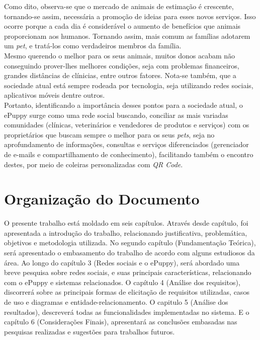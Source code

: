 Como dito, observa-se que o mercado de animais de estimação é crescente, tornando-se assim, necessária a promoção de ideias para esses novos serviços. Isso ocorre porque a cada dia é considerável o aumento de benefícios que animais proporcionam aos humanos. Tornando assim, mais comum as famílias adotarem um {\it pet}, e tratá-los como verdadeiros membros da família.
\\
\indent
Mesmo querendo o melhor para os seus animais, 
muitos donos acabam não conseguindo prover-lhes melhores condições, seja com problemas financeiros, grandes distâncias de clínicias, entre outros fatores. Nota-se também, que a sociedade atual está sempre rodeada por tecnologia, seja utilizando redes sociais, aplicativos móveis dentre outros.
\\
\indent
Portanto, identificando a importância desses pontos para a sociedade atual, o ePuppy surge como uma rede social buscando, conciliar as mais variadas comunidades (clínicas, veterinários e vendedores de produtos e serviços) com os proprietários que buscam sempre o melhor para os seus {\it pets}, seja no aprofundamento de informações, consultas e serviços diferenciados (gerenciador de e-mails e compartilhamento de conhecimento), facilitando também o encontro destes, por meio de coleiras personalizadas com {\it QR Code}.


\section{Organização do Documento}

O presente trabalho está moldado em seis capítulos. Através desde capítulo, foi apresentada a introdução do trabalho, relacionando justificativa, problemática, objetivos e metodologia utilizada. No segundo capítulo (Fundamentação Teórica), será apresentado o embasamento do trabalho de acordo com alguns estudiosos da área. Ao longo do capítulo 3 (Redes sociais e o ePuppy), será abordado uma breve pesquisa sobre redes sociais, e suas principais características, relacionando com o ePuppy e sistemas relacionados. O capítulo 4 (Análise dos requisitos), discorrerá sobre as principais formas de elicitação de requisitos utilizadas, casos de uso e diagramas e entidade-relacionamento. O capitulo 5 (Análise dos resultados), descreverá todas as funcionalidades implementadas no sistema. E o capítulo 6 (Considerações Finais), apresentará as conclusões embasadas nas pesquisas realizadas e sugestões para trabalhos futuros.



\nocite{Nascimento2014}
\nocite{Aguilar2015}
\nocite{Anaya2015}
\nocite{Arias2015}
\nocite{G12015}
\nocite{Gazzana2015}
\nocite{Veja2015}
